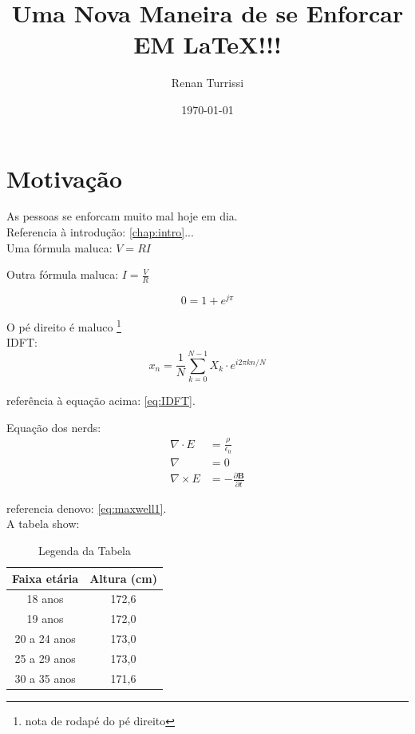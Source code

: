 \documentclass{report}
\author{Renan Turrissi}
\date{\today}
\title{Uma Nova Maneira de se Enforcar EM \LaTeX !!!}
\newcommand{\vetor}[1]{\textbf{#1}}
\begin{document}
\maketitle



\chapter{Motivação}\label{chap:motiv}
As pessoas se enforcam muito mal hoje em dia.\\
Referencia à introdução: \ref{chap:intro}...\\
Uma fórmula maluca: $ V =RI $   

\hfill

Outra fórmula maluca: $ I = \frac{V}{R} $

$$ 0 = 1+e^{j\pi}  $$


O pé direito é maluco
\footnote[2]{nota de rodapé do pé direito}\\


IDFT: 
\begin{equation} \label{eq:IDFT}
 x_n = \frac{1}{N}\sum_{k=0}^{N-1} X_k \cdot e^{i2\pi kn/N} 
\end{equation}

referência à equação acima: \ref{eq:IDFT}.

Equação dos nerds:
\begin{align}
\label{eq:maxwell1}
\nabla \cdot E & = \frac{\rho}{\epsilon_0} \\
\nabla  & = 0 \\
\nabla \times E & = -\frac{\partial \vetor{B}}{\partial t}
\end{align}

referencia denovo: \ref{eq:maxwell1}. \\

A tabela show:

\begin{table}[!htb] \label{tab:TabelaShow}
	\centering
	\begin{tabular}{c|c}
	\hline
	
	Faixa etária & Altura (cm) \\ \hline
	18 anos & 172,6 \\
	19 anos & 172,0 \\
	20 a 24 anos & 173,0 \\
	25 a 29 anos & 173,0 \\
	30 a 35 anos & 171,6 \\
	\hline
	\end{tabular}
	\caption{Legenda da Tabela}
\end{table}
\end{document}
